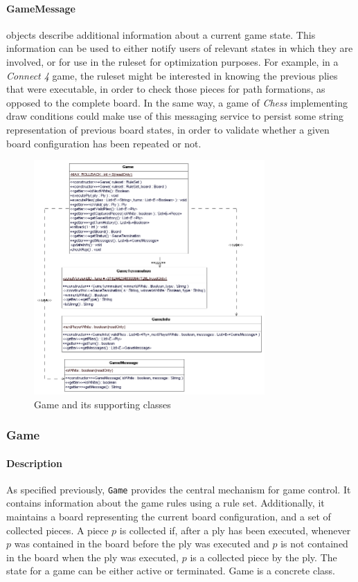 					 \paragraph{GameMessage} objects describe additional information about a current game state. 
					 This information can be used to either notify users of relevant states in which they are
					 involved, or for use in the ruleset for optimization purposes. For example, in a \emph{Connect 4}
					 game, the ruleset might be interested in knowing the previous plies that were executable, 
					 in order to check those pieces for path formations, as opposed to the complete board. In the same 
					 way, a game of \emph{Chess} implementing draw conditions could make use of this messaging 
					 service to persist some string representation of previous board states, in order to validate whether
					 a given board configuration has been repeated or not. 
					  
		\begin{figure}
			\begin{center}
				\includegraphics[width=250pt]{img/game.png}
						\caption{Game and its supporting classes}
	  			\label{ruleset}
		   \end{center}
	\end{figure}
					   
				\subsubsection{Game}
					\paragraph{Description} As specified previously, \texttt{Game} provides the central mechanism for 
						game control. It contains information about the game rules using a rule set. Additionally,
						it maintains a board representing the current board configuration, and a set of collected pieces.
						A piece $p$ is collected if, after a ply has been executed, whenever $p$ was contained in the board
						before the ply was executed and $p$ is not contained in the board when the ply was executed, 
						$p$ is a collected piece by the ply. The state for a game can be either active or terminated. Game
						is a concrete class. 
						
